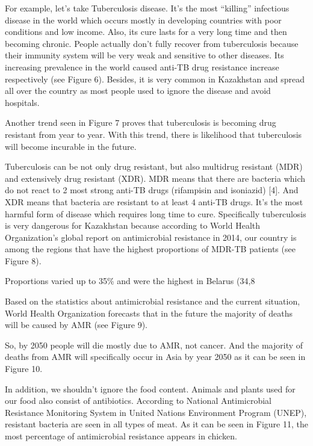 For example, let’s take Tuberculosis disease. It’s the most “killing” infectious disease in the world which occurs mostly in developing countries with poor conditions and low income. Also, its cure lasts for a very long time and then becoming chronic. People actually don’t fully recover from tuberculosis because their immunity system will be very weak and sensitive to other diseases. Its increasing prevalence in the world caused anti-TB drug resistance increase respectively (see Figure 6). Besides, it is very common in Kazakhstan and spread all over the country as most people used to ignore the disease and avoid hospitals.

Another trend seen in Figure 7 proves that tuberculosis is becoming drug resistant from year to year. With this trend, there is likelihood that tuberculosis will become incurable in the future.

Tuberculosis can be not only drug resistant, but also multidrug resistant (MDR) and extensively drug resistant (XDR). MDR means that there are bacteria which do not react to 2 most strong anti-TB drugs (rifampisin and isoniazid) [4]. And XDR means that bacteria are resistant to at least 4 anti-TB drugs. It’s the most harmful form of disease which requires long time to cure. Specifically tuberculosis is very dangerous for Kazakhstan because according to World Health Organization’s global report on antimicrobial resistance in 2014, our country is among the regions that have the highest proportions of MDR-TB patients (see Figure 8).

Proportions varied up to 35\% and were the highest in Belarus (34,8%

Based on the statistics about antimicrobial resistance and the current situation, World Health Organization forecasts that in the future the majority of deaths will be caused by AMR (see Figure 9).

So, by 2050 people will die mostly due to AMR, not cancer. And the majority of deaths from AMR will specifically occur in Asia by year 2050 as it can be seen in Figure 10.

In addition, we shouldn’t ignore the food content. Animals and plants used for our food also consist of antibiotics. According to National Antimicrobial Resistance Monitoring System in United Nations Environment Program (UNEP), resistant bacteria are seen in all types of meat. As it can be seen in Figure 11, the most percentage of antimicrobial resistance appears in chicken.

